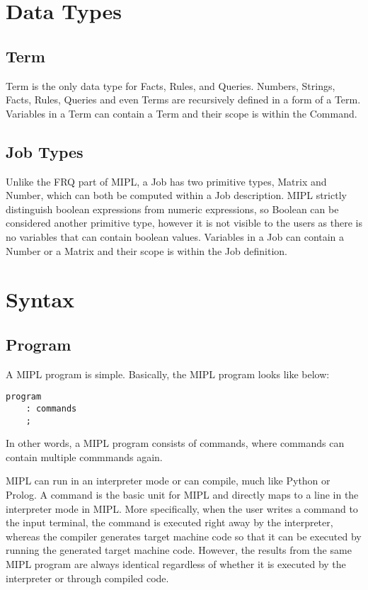 \documentclass[prodmode,acmtecs]{acmsmall}
\begin{document}
\section{Data Types}

\subsection {Term}
Term is the only data type for Facts, Rules, and Queries.  Numbers, Strings,
Facts, Rules, Queries and even Terms are recursively defined in a form of a Term. 
Variables in a Term can contain a Term and their scope is within the Command.
\medskip

\subsection {Job Types}
Unlike the FRQ part of MIPL, a Job has two primitive types, Matrix and
Number, which can both be computed within a Job description. MIPL strictly
distinguish boolean expressions from numeric expressions, so Boolean can be
considered another primitive type, however it is not visible to the users
as there is no variables that can contain boolean values.  Variables in a
Job can contain a Number or a Matrix and their scope is within the Job
definition.

\section{Syntax}

\subsection{Program}

A MIPL program is simple. Basically, the MIPL program looks like below:

\begin{lstlisting}
program
	: commands
	;
\end{lstlisting}

In other words, a MIPL program consists of commands, where commands can contain multiple 
commmands again.

MIPL can run in an interpreter mode or can compile, much like Python or Prolog. A command
is the basic unit for MIPL and directly maps to a line in the interpreter mode in MIPL.
More specifically, when the user writes a command to the
input terminal, the command is executed right away by the interpreter,
whereas the compiler generates target machine code so that it can be
executed by running the generated target machine code.  However, the
results from the same MIPL program are always identical regardless of
whether it is executed by the interpreter or through compiled code.
\end{document}
